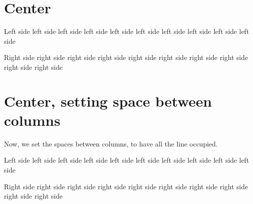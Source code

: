 \documentclass{article}
\begin{document}
\section{Center}

\begin{pairs}

\begin{Leftside}
\beginnumbering
\pstart
Left side left side left side left side left side left side left side left side left side left side 
\pend
\endnumbering
\end{Leftside}

\begin{Rightside}
\beginnumbering
\pstart
Right side right side right side right side right side right side right side right side right side right side 
\pend
\endnumbering
\end{Rightside}
\end{pairs}
\Columns

\section{Center, setting space between columns}

Now, we set the spaces between columns, to have all the line occupied.

\setlength{\beforecolumnseparator}{0.06\textwidth}
\setlength{\aftercolumnseparator}{0.06\textwidth}

\vspace{\baselineskip}

\begin{pairs}

\begin{Leftside}
\beginnumbering
\pstart
Left side left side left side left side left side left side left side left side left side left side 
\pend
\endnumbering
\end{Leftside}

\begin{Rightside}
\beginnumbering
\pstart
Right side right side right side right side right side right side right side right side right side right side 
\pend
\endnumbering
\end{Rightside}
\end{pairs}
\Columns
\end{document}
